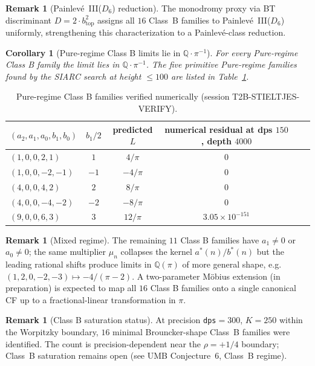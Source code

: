 \documentclass[11pt,a4paper]{article}
\newtheorem{corollary}[theorem]{Corollary}
\theoremstyle{definition}
\newtheorem{remark}[theorem]{Remark}
\begin{document}
\begin{remark}[Painlev\'{e}~III($D_6$) reduction]\label{rem:piii-d6}
The monodromy proxy via BT discriminant
$D = 2\cdot b_{\mathrm{top}}^2$ assigns all $16$
Class~B families to Painlev\'{e}~III($D_6$)
uniformly, strengthening this characterization
to a Painlev\'{e}-class reduction.
\end{remark}

\begin{corollary}[Pure-regime Class B limits lie in $\mathbb{Q}\cdot\pi^{-1}$]\label{cor:classB-pi}
For every Pure-regime Class B family the limit lies in $\mathbb{Q}\cdot\pi^{-1}$. The five primitive Pure-regime families found by the SIARC search at height $\le 100$ are listed in Table~\ref{tab:classB-pure}.
\end{corollary}

\begin{table}[h]
\centering
\begin{tabular}{lccccr}
\toprule
$(a_2,a_1,a_0,b_1,b_0)$ & $b_1/2$ & predicted $L$ & numerical residual at dps $150$, depth $4000$ \\
\midrule
$(1, 0, 0, 2, 1)$    & $1$  & $4/\pi$    & $0$ \\
$(1, 0, 0, -2, -1)$  & $-1$ & $-4/\pi$   & $0$ \\
$(4, 0, 0, 4, 2)$    & $2$  & $8/\pi$    & $0$ \\
$(4, 0, 0, -4, -2)$  & $-2$ & $-8/\pi$   & $0$ \\
$(9, 0, 0, 6, 3)$    & $3$  & $12/\pi$   & $3.05\times 10^{-151}$ \\
\bottomrule
\end{tabular}
\caption{Pure-regime Class B families verified numerically (session T2B-STIELTJES-VERIFY).}
\label{tab:classB-pure}
\end{table}

\begin{remark}[Mixed regime]
The remaining $11$ Class B families have $a_1\ne 0$ or $a_0\ne 0$; the same multiplier $\mu_n$ collapses the kernel $a^*(n)/b^*(n)$ but the leading rational shifts produce limits in $\mathbb{Q}(\pi)$ of more general shape, e.g.\ $(1,2,0,-2,-3)\mapsto -4/(\pi-2)$. A two-parameter Möbius extension (in preparation) is expected to map all $16$ Class B families onto a single canonical CF up to a fractional-linear transformation in $\pi$.
\end{remark}

\begin{remark}[Class B saturation status]\label{rem:classB-saturation}
At precision \texttt{dps}$=300$, $K=250$ within
the Worpitzky boundary, $16$ minimal Brouncker-shape
Class~B families were identified. The count is
precision-dependent near the $\rho=+1/4$ boundary;
Class~B saturation remains open
(see UMB Conjecture~6, Class~B regime).
\end{remark}
\end{document}
